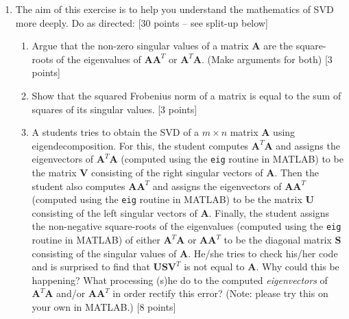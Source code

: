 \documentclass[11pt]{article}
\begin{document}
\begin{enumerate}
\item The aim of this exercise is to help you understand the mathematics of SVD more deeply. Do as directed: \textsf{[30 points -- see split-up below]}
    \begin{enumerate}
        \item Argue that the non-zero singular values of a matrix $\boldsymbol{A}$ are the square-roots of the eigenvalues of $\boldsymbol{AA}^T$ or $\boldsymbol{A}^T\boldsymbol{A}$. (Make arguments for both) \textsf{[3 points]}
        \item Show that the squared Frobenius norm of a matrix is equal to the sum of squares of its singular values. \textsf{[3 points]}
        \item A students tries to obtain the SVD of a $m \times n$ matrix $\boldsymbol{A}$ using eigendecomposition. For this, the student computes $\boldsymbol{A}^T \boldsymbol{A}$ and assigns the eigenvectors of $\boldsymbol{A}^T \boldsymbol{A}$ (computed using the \texttt{eig} routine in MATLAB) to be the matrix $\boldsymbol{V}$ consisting of the right singular vectors of $\boldsymbol{A}$. Then the student also computes $\boldsymbol{A} \boldsymbol{A}^T$ and assigns the eigenvectors of $\boldsymbol{A}\boldsymbol{A}^T$ (computed using the \texttt{eig} routine in MATLAB) to be the matrix $\boldsymbol{U}$ consisting of the left singular vectors of $\boldsymbol{A}$. Finally, the student assigns the non-negative square-roots of the eigenvalues (computed using the \texttt{eig} routine in MATLAB) of either $\boldsymbol{A}^T \boldsymbol{A}$ or $\boldsymbol{A} \boldsymbol{A}^T$ to be the diagonal matrix $\boldsymbol{S}$ consisting of the singular values of $\boldsymbol{A}$. He/she tries to check his/her code and is surprised to find that $\boldsymbol{USV}^T$ is not equal to $\boldsymbol{A}$. Why could this be happening? What processing (s)he do to the computed \emph{eigenvectors} of $\boldsymbol{A}^T \boldsymbol{A}$ and/or $\boldsymbol{A}\boldsymbol{A}^T$ in order rectify this error? (Note: please try this on your own in MATLAB.) \textsf{[8 points]}


\end{enumerate}
\end{enumerate}
\end{document}

